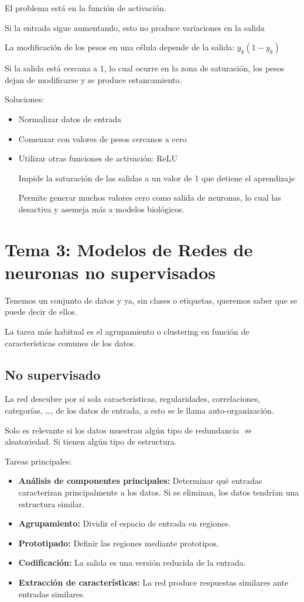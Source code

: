 \documentclass[12pt, twoside, openright]{report} %
\begin{document}
El problema está en la función de activación.

Si la entrada sigue aumentando, esto no produce variaciones en la salida

La modificación de los pesos en una célula depende de la salida: $y_k(1 - y_k)$

Si la salida está cercana a 1, lo cual ocurre en la zona de saturación, los pesos dejan de modificarse y se produce estancamiento.

Soluciones:
\begin{itemize}
	\item Normalizar datos de entrada
	\item Comenzar con valores de pesos cercanos a cero
	\item Utilizar otras funciones de activación: ReLU
	
	Impide la saturación de las salidas a un valor de 1 que detiene el aprendizaje
	
	Permite generar muchos valores cero como salida de neuronas, lo cual las desactiva y asemeja más a modelos biológicos.
\end{itemize}

\chapter{Tema 3: Modelos de Redes de neuronas no supervisados}
Tenemos un conjunto de datos y ya, sin clases o etiquetas, queremos saber que se puede decir de ellos.

La tarea más habitual es el agrupamiento o clustering en función de características comunes de los datos.
\section{No supervisado}
La red descubre por sí sola características, regularidades, correlaciones, categorías, …, de los datos de entrada, a esto se le llama auto-organización. 

Solo es relevante si los datos muestran algún tipo de redundancia $\nRightarrow$ aleatoriedad. Si tienen algún tipo de estructura.

Tareas principales:
\begin{itemize}
	\item \textbf{Análisis de componentes principales:} Determinar qué entradas caracterizan principalmente a los datos. Si se eliminan, los datos tendrían una estructura similar.
	\item \textbf{Agrupamiento:} Dividir el espacio de entrada en regiones.
	\item \textbf{Prototipado:} Definir las regiones mediante prototipos.
	\item \textbf{Codificación:} La salida es una versión reducida de la entrada.
	\item \textbf{Extracción de características:} La red produce respuestas similares ante entradas similares.
\end{itemize}
\end{document}
